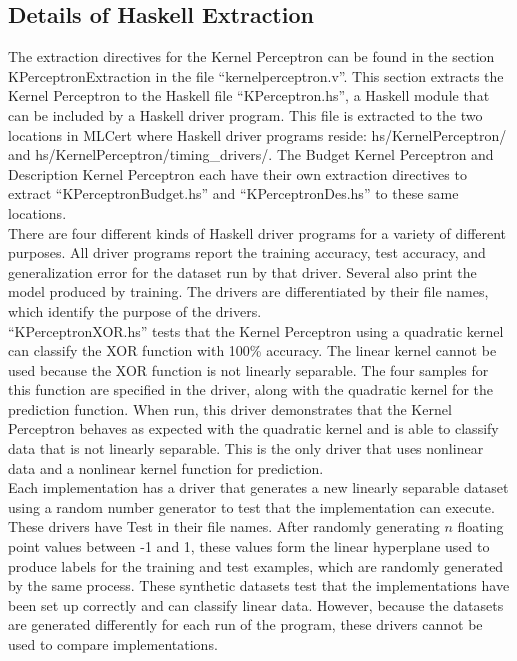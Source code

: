 \subsection{Details of Haskell Extraction}\label{DetailsHaskellExtraction}
The extraction directives for the Kernel Perceptron can be found in the section KPerceptronExtraction in the file ``kernelperceptron.v''. This section extracts the Kernel Perceptron to the Haskell file ``KPerceptron.hs'', a Haskell module that can be included by a Haskell driver program. This file is extracted to the two locations in MLCert where Haskell driver programs reside: hs/KernelPerceptron/ and hs/KernelPerceptron/timing\_drivers/. The Budget Kernel Perceptron and Description Kernel Perceptron each have their own extraction directives to extract ``KPerceptronBudget.hs'' and ``KPerceptronDes.hs'' to these same locations. 
\\There are four different kinds of Haskell driver programs for a variety of different purposes. All driver programs report the training accuracy, test accuracy, and generalization error for the dataset run by that driver. Several also print the model produced by training. The drivers are differentiated by their file names, which identify the purpose of the drivers.
\\``KPerceptronXOR.hs'' tests that the Kernel Perceptron using a quadratic kernel can classify the XOR function with 100\% accuracy. The linear kernel cannot be used because the XOR function is not linearly separable. The four samples for this function are specified in the driver, along with the quadratic kernel for the prediction function. When run, this driver demonstrates that the Kernel Perceptron behaves as expected with the quadratic kernel and is able to classify data that is not linearly separable. This is the only driver that uses nonlinear data and a nonlinear kernel function for prediction.
\\Each implementation has a driver that generates a new linearly separable dataset using a random number generator to test that the implementation can execute. These drivers have Test in their file names. After randomly generating $n$ floating point values between -1 and 1, these values form the linear hyperplane used to produce labels for the training and test examples, which are randomly generated by the same process. These synthetic datasets test that the implementations have been set up correctly and can classify linear data. However, because the datasets are generated differently for each run of the program, these drivers cannot be used to compare implementations.
